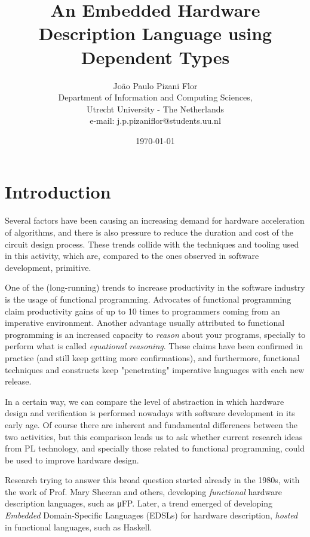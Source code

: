 \documentclass[a4paper]{article}
\title{An Embedded Hardware Description Language using Dependent Types}
\date{\today}
\author{
    João Paulo Pizani Flor \\
    Department of Information and Computing Sciences, \\
    Utrecht University - The Netherlands \\
    e-mail: j.p.pizaniflor@students.uu.nl
}
\begin{document}
    \maketitle


    \section{Introduction}
    \label{sec:intro}
        Several factors have been causing an increasing demand for hardware acceleration of algorithms,
        and there is also pressure to reduce the duration and cost of the circuit design process.
        These trends collide with the techniques and tooling used in this activity, which are,
        compared to the ones observed in software development, primitive.


        One of the (long-running) trends to increase productivity in the software industry
        is the usage of functional programming.
        Advocates of functional programming claim productivity gains of up to 10 times to
        programmers coming from an imperative environment.
        Another advantage usually attributed to functional programming is an increased capacity to
        \emph{reason} about your programs, specially to perform what is called \emph{equational reasoning}.
        These claims have been confirmed in practice (and still keep getting more confirmations),
        and furthermore, functional techniques and constructs keep "penetrating" imperative languages
        with each new release. %


        In a certain way, we can compare the level of abstraction in which hardware design and verification
        is performed nowadays with software development in its early age.
        Of course there are inherent and fundamental differences between the two activities, but
        this comparison leads us to ask whether current research ideas from PL technology,
        and specially those related to functional programming, could be used to improve hardware design.

        Research trying to answer this broad question started already in the 1980s,
        with the work of Prof. Mary Sheeran and others,
        developing \emph{functional} hardware description languages, such as μFP.
        Later, a trend emerged of developing \emph{Embedded} Domain-Specific Languages (EDSLs)
        for hardware description, \emph{hosted} in functional languages, such as Haskell.
\end{document}
